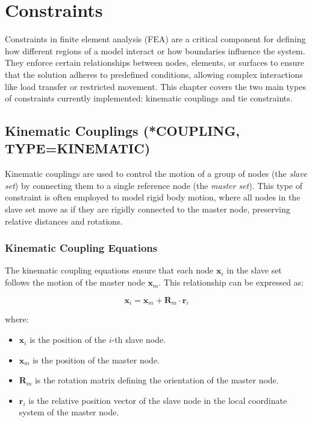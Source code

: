 \chapter{Constraints}
\label{chap:constraints}

Constraints in finite element analysis (FEA) are a critical component for defining how different regions of a model interact or how boundaries influence the system. They enforce certain relationships between nodes, elements, or surfaces to ensure that the solution adheres to predefined conditions, allowing complex interactions like load transfer or restricted movement. This chapter covers the two main types of constraints currently implemented: kinematic couplings and tie constraints.

\section{Kinematic Couplings (*COUPLING, TYPE=KINEMATIC)}

Kinematic couplings are used to control the motion of a group of nodes (the \textit{slave set}) by connecting them to a single reference node (the \textit{master set}). This type of constraint is often employed to model rigid body motion, where all nodes in the slave set move as if they are rigidly connected to the master node, preserving relative distances and rotations.

\subsection{Kinematic Coupling Equations}

The kinematic coupling equations ensure that each node \( \mathbf{x}_i \) in the slave set follows the motion of the master node \( \mathbf{x}_m \). This relationship can be expressed as:

\[
\mathbf{x}_i = \mathbf{x}_m + \mathbf{R}_m \cdot \mathbf{r}_i
\]

where:
\begin{itemize}
    \item \( \mathbf{x}_i \) is the position of the \( i \)-th slave node.
    \item \( \mathbf{x}_m \) is the position of the master node.
    \item \( \mathbf{R}_m \) is the rotation matrix defining the orientation of the master node.
    \item \( \mathbf{r}_i \) is the relative position vector of the slave node in the local coordinate system of the master node.
\end{itemize}

